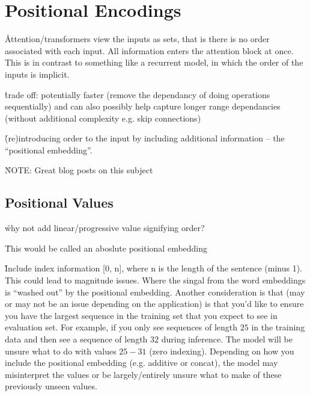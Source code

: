 \chapter{Positional Encodings}



\r{Attention/transformers view the inputs as sets, that is there is no order associated with each input. All information enters the attention block at once. This is in contrast to something like a recurrent model, in which the order of the inputs is implicit.}

\r{trade off: potentially faster (remove the dependancy of doing operations sequentially) and can also possibly help capture longer range dependancies (without additional complexity e.g. skip connections)}

\r{(re)introducing order to the input by including additional information -- the ``positional embedding''.}

\r{NOTE: Great blog posts on this subject~\cite{kazemnejad_2021, kernes_2021, kernes_2021B}}

\section{Positional Values}

\r{why not add linear/progressive value signifying order?}

\r{This would be called an aboslute positional embedding}

\r{Include index information [0, n], where n is the length of the sentence (minus 1). This could lead to magnitude issues. Where the singal from the word embeddings is ``washed out'' by the positional embedding.  Another consideration is that (may or may not be an issue depending on the application) is that you'd like to ensure you have the largest sequence in the training set that you expect to see in evaluation set. For example, if you only see sequences of length $25$ in the training data and then see a sequence of length $32$ during inference. The model will be unsure what to do with values $25 - 31$ (zero indexing). Depending on how you include the positional embedding (e.g. additive or concat), the model may misinterpret the values or be largely/entirely unsure what to make of these previously unseen values.}


